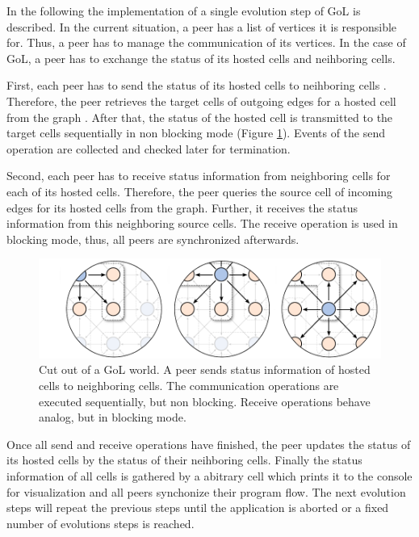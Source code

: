 In the following the implementation of a single evolution step of GoL
is described.  In the current situation, a peer has a list of vertices
it is responsible for. Thus, a peer has to manage the communication of
its vertices. In the case of GoL, a peer has to exchange the status of
its hosted cells and neihboring cells.

First, each peer has to send the status of its hosted cells to
neihboring cells . Therefore, the peer retrieves the target cells of
outgoing edges for a hosted cell from the graph . After that, the
status of the hosted cell is transmitted to the target cells
sequentially in non blocking mode (Figure
\ref{fig:gol_communication}). Events of the send operation are
collected and checked later for termination.

Second, each peer has to receive status information from neighboring
cells for each of its hosted cells. Therefore, the peer queries the
source cell of incoming edges for its hosted cells from the
graph. Further, it receives the status information from this
neighboring source cells.  The receive operation is used in blocking
mode, thus, all peers are synchronized afterwards.


\begin{figure}[H]
  \centering
  \includegraphics[width=\textwidth]{graphics/40_gol_communication}
  \caption{Cut out of a GoL world. A peer sends status information of
    hosted cells to neighboring cells. The communication operations
    are executed sequentially, but non blocking. Receive operations
    behave analog, but in blocking mode.}
  \label{fig:gol_communication}
\end{figure}


Once all send and receive operations have finished, the peer updates
the status of its hosted cells by the status of their neihboring
cells. Finally the status information of all cells is gathered by a
abitrary cell which prints it to the console for visualization and all
peers synchonize their program flow.  The next evolution steps will
repeat the previous steps until the application is aborted or a fixed
number of evolutions steps is reached.

